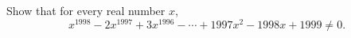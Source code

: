 Show that for every real number $x$,
\[x^{1998}-2x^{1997}+3x^{1996}-\cdots+1997x^2-1998x+1999\ne0.\]
